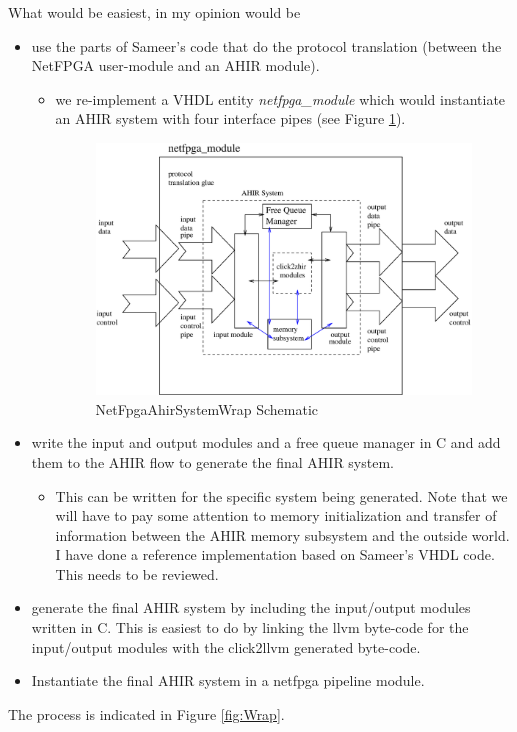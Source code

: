 \documentclass{article}
\begin{document}
What would be easiest, in my opinion would be
\begin{itemize}
\item use the parts of Sameer's code that do the protocol
translation (between the NetFPGA user-module and an AHIR module).
\begin{itemize}
\item we re-implement a VHDL entity {\em netfpga\_module} which 
would instantiate an AHIR system with four interface pipes (see Figure \ref{fig:NetFpgaAhirSystemWrap}).
\begin{figure}
  \centering
  \includegraphics[scale=0.7]{NetFpgaAhirSystemWrap.eps}
  \caption{NetFpgaAhirSystemWrap Schematic}
  \label{fig:NetFpgaAhirSystemWrap}
\end{figure}
\end{itemize}
\item write the input and output modules and
a free queue manager in C and add them 
to the AHIR flow to generate the final AHIR system. 
\begin{itemize}
\item This can be written for
the specific system being generated.  Note that we will have
to pay some attention to memory initialization and transfer of
information between the AHIR memory subsystem and the outside
world.  I have done a reference implementation based on
Sameer's VHDL code.  This needs to be reviewed.
\end{itemize}
\item generate the final AHIR system by including the input/output modules
written in C.  This is easiest to do by linking the llvm byte-code for
the input/output modules with the click2llvm generated byte-code.
\item Instantiate the final AHIR system in a netfpga pipeline module.
\end{itemize}
The process is indicated in Figure \ref{fig:Wrap}.   
\end{document}
